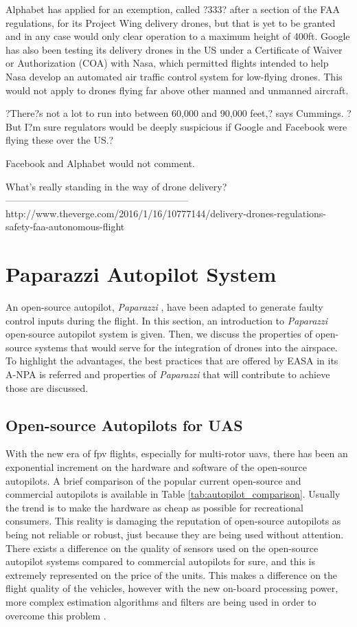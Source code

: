 Alphabet has applied for an exemption, called ?333? after a section of the FAA regulations, for its Project Wing delivery drones, but that is yet to be granted and in any case would only clear operation to a maximum height of 400ft. Google has also been testing its delivery drones in the US under a Certificate of Waiver or Authorization (COA) with Nasa, which permitted flights intended to help Nasa develop an automated air traffic control system for low-flying drones. This would not apply to drones flying far above other manned and unmanned aircraft.

?There?s not a lot to run into between 60,000 and 90,000 feet,? says Cummings. ?But I?m sure regulators would be deeply suspicious if Google and Facebook were flying these over the US.?

Facebook and Alphabet would not comment.

What's really standing in the way of drone delivery?
---------------------------------------------------------
http://www.theverge.com/2016/1/16/10777144/delivery-drones-regulations-safety-faa-autonomous-flight
\fi

\section{Paparazzi Autopilot System}
An open-source autopilot, \emph{Paparazzi} \cite{brisset2006paparazzi}, have been adapted to generate faulty control inputs during the flight. 
In this section, an introduction to \emph{Paparazzi} open-source autopilot system is given. Then, we discuss the properties of open-source systems that would serve for the integration of drones into the airspace. To highlight the advantages, the best practices that are offered by EASA in its A-NPA \cite{A_NPA_EASA2015} is referred and properties of \emph{Paparazzi} that will contribute to achieve those are discussed.

\subsection{Open-source Autopilots for UAS}
With the new era of \gls{fpv} flights, especially for multi-rotor \gls{uav}s, there has been an exponential increment on the hardware and software of the open-source autopilots. A brief comparison of the popular current open-source and commercial autopilots is available in Table \ref{tab:autopilot_comparison}. Usually the trend is to make the hardware as cheap as possible for recreational consumers. This reality is damaging the reputation of open-source autopilots as being not reliable or robust, just because they are being used without attention. There exists a difference on the quality of sensors used on the open-source autopilot systems compared to commercial autopilots for sure, and this is extremely represented on the price of the units. This makes a difference on the flight quality of the vehicles, however with the new on-board processing power, more complex estimation algorithms and filters are being used in order to overcome this problem \cite{baskaya2016flexible}.

